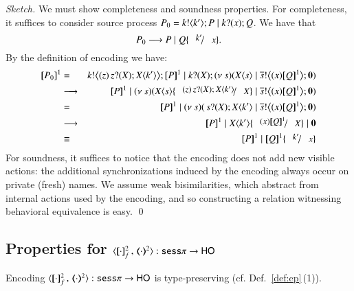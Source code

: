 \begin{proof}[Sketch]
	We must show completeness and soundness properties. 
	For completeness, it suffices to consider source process
	$P_0 = k ! \langle k' \rangle ; P \;|\; k ? (x) ; Q$. We have that
%
	\[
		P_0 \red P \Par Q\subst{k'}{x}.
	\]
%
	By the definition of encoding we have:
	\begin{eqnarray*}
		\pmap{P_0}{1} & = & \bbout{k}{ \abs{z}{\,\binp{z}{X} \appl{X}{k'}} } \pmap{P}{1} \Par \binp{k}{X} \newsp{s}{\appl{X}{s} \Par \bbout{\dual{s}}{\abs{x} \pmap{Q}{1}} \inact}  \\
		& \red & \pmap{P}{1} \Par \newsp{s}{\appl{X}{s} \subst{\abs{z}{\,\binp{z}{X} \appl{X}{k'}}}{X} \Par \bbout{\dual{s}}{\abs{x} \pmap{Q}{1}} \inact} \\
		& = & \pmap{P}{1} \Par \newsp{s}{\,\binp{s}{X} \appl{X}{k'} \Par \bbout{\dual{s}}{\abs{x} \pmap{Q}{1}} \inact} \\
		& \red & \pmap{P}{1} \Par \appl{X}{k'} \subst{\abs{x} \pmap{Q}{1}}{X} \Par \inact \\
		& \scong & \pmap{P}{1} \Par \pmap{Q}{1}\subst{k'}{x}  
	\end{eqnarray*}
	For soundness, it suffices to notice that the encoding does not add new visible actions:
	the additional synchronizations induced by the encoding always occur on private (fresh) names.
	We assume weak bisimilarities, which abstract from internal actions used by the encoding,
	and so  constructing a relation witnessing behavioral equivalence is easy.
	\qed
\end{proof}


\subsection{Properties for $\fencod{\cdot}{\cdot}{2}{f}: \sesp \to \HO$}

\begin{proposition}\rm
	\label{app:enc_sesp_to_HO_t}
	Encoding $\fencod{\cdot}{\cdot}{2}{f}: \sesp \to \HO$  
	is type-preserving (cf. Def.~\ref{def:ep}\,(1)).
\end{proposition}

